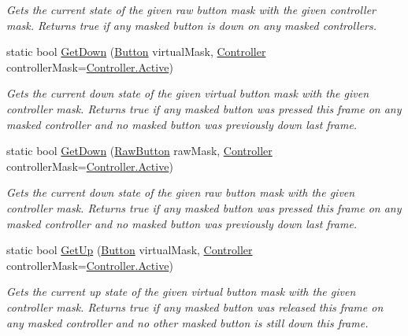 \begin{DoxyCompactItemize}
\begin{DoxyCompactList}\small\item\em Gets the current state of the given raw button mask with the given controller mask. Returns true if any masked button is down on any masked controllers. \end{DoxyCompactList}\item 
static bool \mbox{\hyperlink{class_o_v_r_input_a9c2ccada669b0054fd25a82e84d659c9}{Get\+Down}} (\mbox{\hyperlink{class_o_v_r_input_aed3cf5b4b5e0669cea0941f61e018ee5}{Button}} virtual\+Mask, \mbox{\hyperlink{class_o_v_r_input_a5c86f9052a9cbb0b73779ff5704d60a8}{Controller}} controller\+Mask=\mbox{\hyperlink{class_o_v_r_input_a5c86f9052a9cbb0b73779ff5704d60a8a4d3d769b812b6faa6b76e1a8abaece2d}{Controller.\+Active}})
\begin{DoxyCompactList}\small\item\em Gets the current down state of the given virtual button mask with the given controller mask. Returns true if any masked button was pressed this frame on any masked controller and no masked button was previously down last frame. \end{DoxyCompactList}\item 
static bool \mbox{\hyperlink{class_o_v_r_input_aa1f47bbdab31082c5173cb8905b720d5}{Get\+Down}} (\mbox{\hyperlink{class_o_v_r_input_a9d6423af820e22b93f0b33a4fc4bf77a}{Raw\+Button}} raw\+Mask, \mbox{\hyperlink{class_o_v_r_input_a5c86f9052a9cbb0b73779ff5704d60a8}{Controller}} controller\+Mask=\mbox{\hyperlink{class_o_v_r_input_a5c86f9052a9cbb0b73779ff5704d60a8a4d3d769b812b6faa6b76e1a8abaece2d}{Controller.\+Active}})
\begin{DoxyCompactList}\small\item\em Gets the current down state of the given raw button mask with the given controller mask. Returns true if any masked button was pressed this frame on any masked controller and no masked button was previously down last frame. \end{DoxyCompactList}\item 
static bool \mbox{\hyperlink{class_o_v_r_input_a27ab53793953a2222097e5664852c6ad}{Get\+Up}} (\mbox{\hyperlink{class_o_v_r_input_aed3cf5b4b5e0669cea0941f61e018ee5}{Button}} virtual\+Mask, \mbox{\hyperlink{class_o_v_r_input_a5c86f9052a9cbb0b73779ff5704d60a8}{Controller}} controller\+Mask=\mbox{\hyperlink{class_o_v_r_input_a5c86f9052a9cbb0b73779ff5704d60a8a4d3d769b812b6faa6b76e1a8abaece2d}{Controller.\+Active}})
\begin{DoxyCompactList}\small\item\em Gets the current up state of the given virtual button mask with the given controller mask. Returns true if any masked button was released this frame on any masked controller and no other masked button is still down this frame. \end{DoxyCompactList}\item 

\end{DoxyCompactItemize}
